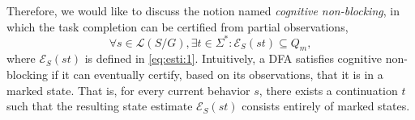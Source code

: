 \documentclass[journal,twoside,web]{ieeecolor}
\begin{document}
Therefore, we would like to discuss the notion named \emph{cognitive non-blocking}, in which the task completion can be certified from partial observations, 
\begin{equation}
    \forall s \in \mathcal{L}(S/G), \exists t \in \Sigma^* : \mathcal{E}_S(st) \subseteq Q_m,
\end{equation}
%
%
%
where $\mathcal{E}_S(st)$ is defined in \eqref{eq:esti:1}.
Intuitively, a DFA satisfies cognitive non-blocking if it can eventually certify, based on its observations, that it is in a marked state. 
That is, for every current behavior $s$, there exists a continuation $t$ such that the resulting state estimate $\mathcal{E}_S(st)$ consists entirely of marked states.
\end{document}
